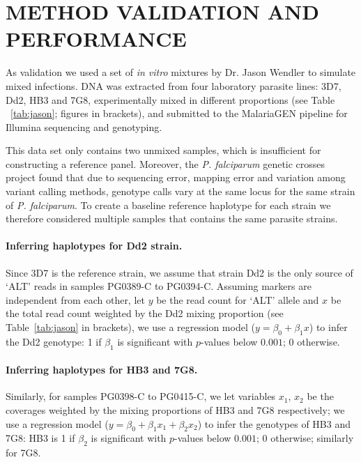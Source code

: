 \documentclass{nature}
\begin{document}
\section*{METHOD VALIDATION AND PERFORMANCE}

As validation we used a set of {\it in vitro} mixtures\cite{Wendler2015} by Dr. Jason Wendler to simulate mixed infections. DNA was extracted from four laboratory parasite lines: 3D7, Dd2, HB3 and 7G8, experimentally mixed in different proportions (see Table ~\ref{tab:jason}; figures in brackets), and submitted to the MalariaGEN pipeline\cite{MalariaGen2008} for Illumina sequencing and genotyping\cite{Menske2012}.

This data set only contains two unmixed samples, which is insufficient for constructing a reference panel. Moreover, the {\em P. falciparum} genetic crosses project\cite{Miles2016} found that due to sequencing error, mapping error and variation among variant calling methods, genotype calls vary at the same locus for the same strain of {\it P. falciparum}. To create a baseline reference haplotype for each strain we therefore considered multiple samples that contains the same parasite strains.

\paragraph{Inferring haplotypes for Dd2 strain.}
Since 3D7 is the reference strain, we assume that strain Dd2 is the only source of `ALT' reads in samples {\textmd PG0389-C} to {\textmd PG0394-C}. Assuming markers are independent from each other, let $y$ be the read count for `ALT' allele and $x$ be the total read count weighted by the Dd2 mixing proportion (see Table~\ref{tab:jason} in brackets), we use a regression model ($y = \beta_0 + \beta_{1} x$) to infer the Dd2 genotype: 1 if $\beta_{1}$ is significant with $p$-values below $0.001$; 0 otherwise.

\paragraph{Inferring haplotypes for HB3 and 7G8.}
Similarly, for samples {\textmd PG0398-C} to {\textmd PG0415-C}, we let variables $x_1$, $x_2$ be the coverages weighted by the mixing proportions of HB3 and 7G8 respectively; we use a regression model ($y = \beta_0 + \beta_{1} x_1 + \beta_{2} x_2$) to infer the genotypes of HB3 and 7G8: HB3 is 1 if $\beta_{2}$ is significant with $p$-values below $0.001$; 0 otherwise; similarly for 7G8.
\end{document}

